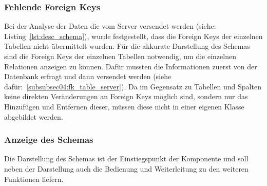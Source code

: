 \subsubsection{Fehlende Foreign Keys}
\label{subsubsec04:miss_fk}

Bei der Analyse der Daten die vom Server versendet werden (siehe: Listing~\ref{lst:desc_schema}), wurde festgestellt, dass die Foreign Keys der einzelnen Tabellen nicht übermittelt wurden.
Für die akkurate Darstellung des Schemas sind die Foreign Keys der einzelnen Tabellen notwendig, um die einzelnen Relationen anzeigen zu können.
Dafür mussten die Informationen zuerst von der Datenbank erfragt und dann versendet werden (siehe dafür:~\ref{subsubsec04:fk_table_server}).
Da im Gegensatz zu Tabellen und Spalten keine direkten Veränderungen an Foreign Keys möglich sind, sondern nur das Hinzufügen und Entfernen dieser, müssen diese nicht in einer eigenen Klasse abgebildet werden.



\subsubsection{Anzeige des Schemas}
\label{subsubsec04:anz_schema}

Die Darstellung des Schemas ist der Einstiegspunkt der Komponente und soll neben der Darstellung auch die Bedienung und Weiterleitung zu den weiteren Funktionen liefern.

